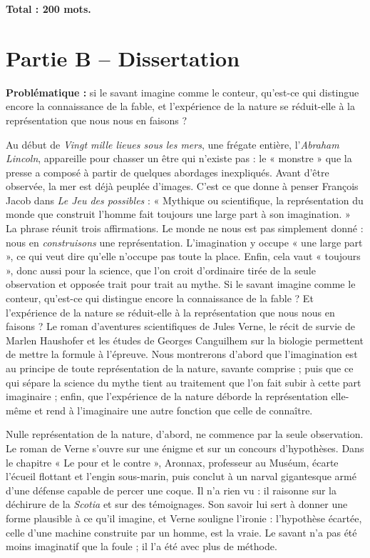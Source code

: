 \documentclass[11pt,a4paper]{article}
\begin{document}
\textbf{Total : 200 mots.}

\hypertarget{partie-b-dissertation}{%
\section{Partie B -- Dissertation}\label{partie-b-dissertation}}

\textbf{Problématique :} si le savant imagine comme le conteur, qu'est-ce qui distingue encore la connaissance de la fable, et l'expérience de la nature se réduit-elle à la représentation que nous nous en faisons ?

Au début de \emph{Vingt mille lieues sous les mers}, une frégate entière, l'\emph{Abraham Lincoln}, appareille pour chasser un être qui n'existe pas : le « monstre » que la presse a composé à partir de quelques abordages inexpliqués. Avant d'être observée, la mer est déjà peuplée d'images. C'est ce que donne à penser François Jacob dans \emph{Le Jeu des possibles} : « Mythique ou scientifique, la représentation du monde que construit l'homme fait toujours une large part à son imagination. » La phrase réunit trois affirmations. Le monde ne nous est pas simplement donné : nous en \emph{construisons} une représentation. L'imagination y occupe « une large part », ce qui veut dire qu'elle n'occupe pas toute la place. Enfin, cela vaut « toujours », donc aussi pour la science, que l'on croit d'ordinaire tirée de la seule observation et opposée trait pour trait au mythe. Si le savant imagine comme le conteur, qu'est-ce qui distingue encore la connaissance de la fable ? Et l'expérience de la nature se réduit-elle à la représentation que nous nous en faisons ? Le roman d'aventures scientifiques de Jules Verne, le récit de survie de Marlen Haushofer et les études de Georges Canguilhem sur la biologie permettent de mettre la formule à l'épreuve. Nous montrerons d'abord que l'imagination est au principe de toute représentation de la nature, savante comprise ; puis que ce qui sépare la science du mythe tient au traitement que l'on fait subir à cette part imaginaire ; enfin, que l'expérience de la nature déborde la représentation elle-même et rend à l'imaginaire une autre fonction que celle de connaître.

Nulle représentation de la nature, d'abord, ne commence par la seule observation. Le roman de Verne s'ouvre sur une énigme et sur un concours d'hypothèses. Dans le chapitre « Le pour et le contre », Aronnax, professeur au Muséum, écarte l'écueil flottant et l'engin sous-marin, puis conclut à un narval gigantesque armé d'une défense capable de percer une coque. Il n'a rien vu : il raisonne sur la déchirure de la \emph{Scotia} et sur des témoignages. Son savoir lui sert à donner une forme plausible à ce qu'il imagine, et Verne souligne l'ironie : l'hypothèse écartée, celle d'une machine construite par un homme, est la vraie. Le savant n'a pas été moins imaginatif que la foule ; il l'a été avec plus de méthode.
\end{document}
